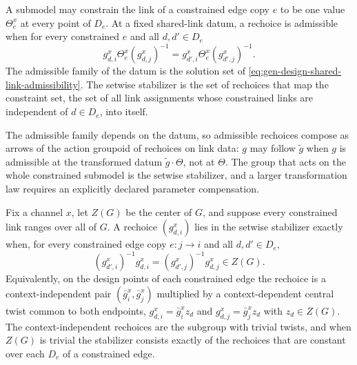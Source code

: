 A submodel may constrain the link of a constrained edge copy \(e\) to be one value \(\Theta_e^x\) at
every point of \(D_e\). At a fixed shared-link datum, a rechoice is admissible when for every
constrained \(e\) and all \(d,d'\in D_e\)
\begin{equation}
g_{d,i}^x\Theta_e^x(g_{d,j}^x)^{-1}
=g_{d',i}^x\Theta_e^x(g_{d',j}^x)^{-1}.
\label{eq:gen-design-shared-link-admissibility}
\end{equation}
The admissible family of the datum is the solution set of \eqref{eq:gen-design-shared-link-admissibility}.
The setwise stabilizer is the set of rechoices that map the constraint set, the set of all link
assignments whose constrained links are independent of \(d\in D_e\), into itself.

The admissible family depends on the datum, so admissible rechoices compose as arrows of the action
groupoid of rechoices on link data: \(g\) may follow \(\widetilde g\) when \(g\) is admissible at the
transformed datum \(\widetilde g\cdot\Theta\), not at \(\Theta\). The group that acts on the whole
constrained submodel is the setwise stabilizer, and a larger transformation law requires an
explicitly declared parameter compensation.

Fix a channel \(x\), let \(Z(G)\) be the center of \(G\), and suppose every constrained link ranges
over all of \(G\). A rechoice \((g_{d,i}^x)\) lies in the setwise stabilizer exactly when, for every
constrained edge copy \(e:j\to i\) and all \(d,d'\in D_e\),
\begin{equation}
(g_{d',i}^x)^{-1}g_{d,i}^x=(g_{d',j}^x)^{-1}g_{d,j}^x\in Z(G).
\label{eq:gen-shared-link-stabilizer}
\end{equation}
Equivalently, on the design points of each constrained edge the rechoice is a context-independent
pair \((\bar g_i^x,\bar g_j^x)\) multiplied by a context-dependent central twist common to both
endpoints, \(g_{d,i}^x=\bar g_i^xz_d\) and \(g_{d,j}^x=\bar g_j^xz_d\) with \(z_d\in Z(G)\). The
context-independent rechoices are the subgroup with trivial twists, and when \(Z(G)\) is trivial the
stabilizer consists exactly of the rechoices that are constant over each \(D_e\) of a constrained
edge. 

